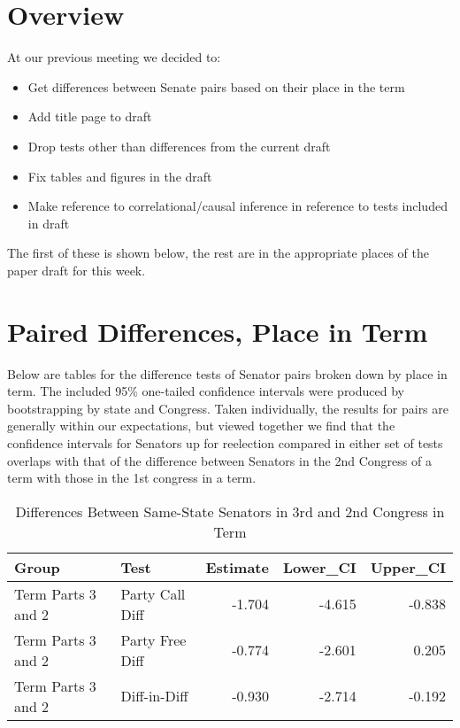 \documentclass[12pt]{article}
\begin{document}
\section{Overview}

At our previous meeting we decided to:

\begin{itemize}
	
	\item Get differences between Senate pairs based on their place in the term
	
	\item Add title page to draft
	
	\item Drop tests other than differences from the current draft
	
	\item Fix tables and figures in the draft
	
	\item Make reference to correlational/causal inference in reference to tests included in draft
	
\end{itemize}

The first of these is shown below, the rest are in the appropriate places of the paper draft for this week.

\section{Paired Differences, Place in Term}

Below are tables for the difference tests of Senator pairs broken down by place in term. The included 95\% one-tailed confidence intervals were produced by bootstrapping by state and Congress. Taken individually, the results for pairs are generally within our expectations, but viewed together we find that the confidence intervals for Senators up for reelection compared in either set of tests overlaps with that of the difference between Senators in the 2nd Congress of a term with those in the 1st congress in a term.

\begin{table}[H]
	\centering
	\caption{Differences Between Same-State Senators in 3rd and 2nd Congress in Term} 
	\begin{tabular}{llrrr}
		\hline
		Group & Test & Estimate & Lower\_CI & Upper\_CI \\ 
		\hline
		Term Parts 3 and 2 & Party Call Diff & -1.704 & -4.615 & -0.838 \\ 
		Term Parts 3 and 2 & Party Free Diff & -0.774 & -2.601 & 0.205 \\ 
		Term Parts 3 and 2 & Diff-in-Diff & -0.930 & -2.714 & -0.192 \\ 
		\hline
	\end{tabular}
\end{table}
\end{document}
